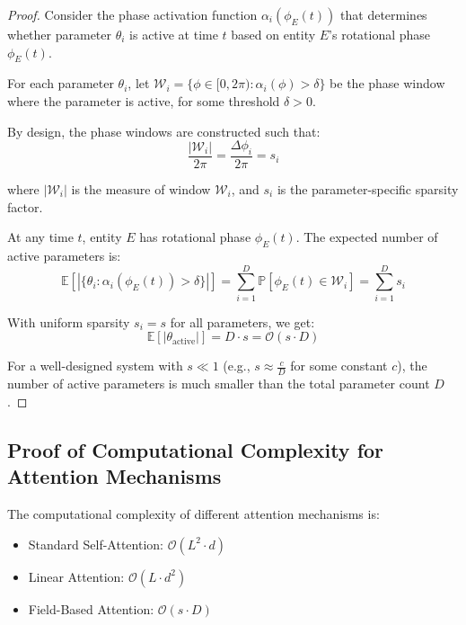 \begin{proof}
Consider the phase activation function $\alpha_i(\phi_E(t))$ that determines whether parameter $\theta_i$ is active at time $t$ based on entity $E$'s rotational phase $\phi_E(t)$.

For each parameter $\theta_i$, let $\mathcal{W}_i = \{\phi \in [0, 2\pi) : \alpha_i(\phi) > \delta\}$ be the phase window where the parameter is active, for some threshold $\delta > 0$.

By design, the phase windows are constructed such that:
\begin{equation}
\frac{|\mathcal{W}_i|}{2\pi} = \frac{\Delta\phi_i}{2\pi} = s_i
\end{equation}

where $|\mathcal{W}_i|$ is the measure of window $\mathcal{W}_i$, and $s_i$ is the parameter-specific sparsity factor.

At any time $t$, entity $E$ has rotational phase $\phi_E(t)$. The expected number of active parameters is:
\begin{equation}
\mathbb{E}[|\{\theta_i : \alpha_i(\phi_E(t)) > \delta\}|] = \sum_{i=1}^D \mathbb{P}[\phi_E(t) \in \mathcal{W}_i] = \sum_{i=1}^D s_i
\end{equation}

With uniform sparsity $s_i = s$ for all parameters, we get:
\begin{equation}
\mathbb{E}[|\theta_{\text{active}}|] = D \cdot s = \mathcal{O}(s \cdot D)
\end{equation}

For a well-designed system with $s \ll 1$ (e.g., $s \approx \frac{c}{D}$ for some constant $c$), the number of active parameters is much smaller than the total parameter count $D$.
\end{proof}

\subsection{Proof of Computational Complexity for Attention Mechanisms}

\begin{theorem}
The computational complexity of different attention mechanisms is:
\begin{itemize}
    \item Standard Self-Attention: $\mathcal{O}(L^2 \cdot d)$
    \item Linear Attention: $\mathcal{O}(L \cdot d^2)$
    \item Field-Based Attention: $\mathcal{O}(s \cdot D)$
\end{itemize}
\end{theorem}

